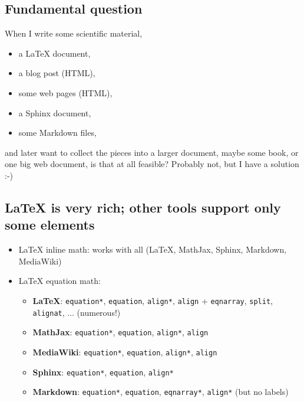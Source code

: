 \documentclass[%
oneside,                 %
final,                   %
10pt]{article}
\begin{document}
\subsection{Fundamental question}
When I write some scientific material,
\begin{itemize}
 \item a {\LaTeX} document,
 \item a blog post (HTML),
 \item some web pages (HTML),
 \item a Sphinx document,
 \item some Markdown files,
\end{itemize}
\noindent
and later want to collect the pieces into a larger document, maybe
some book, or one big web document, is that at all feasible?
Probably not, but I have a solution :-)
\subsection{{\LaTeX} is very rich; other tools support only some elements}
\begin{itemize}
 \item {\LaTeX} inline math: works with all ({\LaTeX}, MathJax, Sphinx, Markdown, MediaWiki)
 \item {\LaTeX} equation math:
\begin{itemize}
    \item \textbf{LaTeX}: \texttt{equation*}, \texttt{equation}, \texttt{align*}, \texttt{align} + \texttt{eqnarray}, \texttt{split}, \texttt{alignat}, ... (numerous!)
    \item \textbf{MathJax}: \texttt{equation*}, \texttt{equation}, \texttt{align*}, \texttt{align}
    \item \textbf{MediaWiki}: \texttt{equation*}, \texttt{equation}, \texttt{align*}, \texttt{align}
    \item \textbf{Sphinx}: \texttt{equation*}, \texttt{equation}, \texttt{align*}
    \item \textbf{Markdown}: \texttt{equation*}, \texttt{equation}, \texttt{eqnarray*}, \texttt{align*} (but no labels)
\end{itemize}
\noindent
\end{itemize}
\noindent
\end{document}
